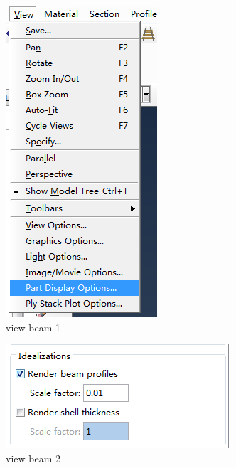 \documentclass[10pt,a4paper]{article}
\begin{document}
\begin{figure}[h!]
\centering
\includegraphics[width=0.7\linewidth]{view_beam_1}
\caption{view beam 1}
\label{fig:viewbeam1}
\end{figure}

\begin{figure}[h!]
\centering
\includegraphics[width=0.7\linewidth]{view_beam_2}
\caption{view beam 2}
\label{fig:viewbeam2}
\end{figure}
\end{document}

